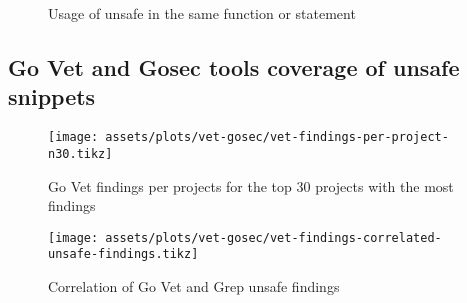 \begin{figure}[ht]
    \centering
    \caption{Usage of unsafe in the same function or statement}
    \label{fig:correlations-unsafe-usage-same-function-and-statement}
\end{figure}



\subsection{Go Vet and Gosec tools coverage of unsafe snippets}\label{subsec:results-vet-gosec}

\begin{figure}[ht]
    \centering
    {\scriptsize \texttt{[image: assets/plots/vet-gosec/vet-findings-per-project-n30.tikz]}}
    \caption{Go Vet findings per projects for the top 30 projects with the most findings}
    \label{fig:vet-findings-per-project-n30}
\end{figure}

\begin{figure}[ht]
    \centering
    {\scriptsize \texttt{[image: assets/plots/vet-gosec/vet-findings-correlated-unsafe-findings.tikz]}}
    \caption{Correlation of Go Vet and Grep unsafe findings}
    \label{fig:correlation-vet-grep-findings}
\end{figure}

